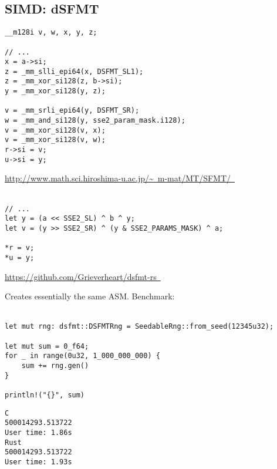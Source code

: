 \documentclass[14pt]{beamer}
\newcommand{\exturl}[1]{\exthref{#1}{#1}}
\newcommand{\exthref}[2]{\href{#1}{#2\ \footnotesize\faExternalLink}}
\begin{document}
\subsection{SIMD: dSFMT}
\begin{frame}[fragile]
  \fontsize{8pt}{8pt}\selectfont
  \begin{verbatim}
__m128i v, w, x, y, z;

// ...
x = a->si;
z = _mm_slli_epi64(x, DSFMT_SL1);
z = _mm_xor_si128(z, b->si);
y = _mm_xor_si128(y, z);

v = _mm_srli_epi64(y, DSFMT_SR);
w = _mm_and_si128(y, sse2_param_mask.i128);
v = _mm_xor_si128(v, x);
v = _mm_xor_si128(v, w);
r->si = v;
u->si = y;
  \end{verbatim}

  \begin{flushright}
    \exthref{http://www.math.sci.hiroshima-u.ac.jp/~\%20m-mat/MT/SFMT/}{http://www.math.sci.hiroshima-u.ac.jp/\textasciitilde\ m-mat/MT/SFMT/}\\~\\
  \end{flushright}

\pause
  \begin{verbatim}
// ...
let y = (a << SSE2_SL) ^ b ^ y;
let v = (y >> SSE2_SR) ^ (y & SSE2_PARAMS_MASK) ^ a;

*r = v;
*u = y;
  \end{verbatim}

  \begin{flushright}
    \exturl{https://github.com/Grieverheart/dsfmt-rs}
  \end{flushright}

\end{frame}

\begin{frame}[fragile]
  Creates essentially the same ASM. Benchmark:\\~\\

\fontsize{10pt}{10pt}\selectfont
  \begin{verbatim}
let mut rng: dsfmt::DSFMTRng = SeedableRng::from_seed(12345u32);

let mut sum = 0_f64;
for _ in range(0u32, 1_000_000_000) {
    sum += rng.gen()
}

println!("{}", sum)
  \end{verbatim}

\begin{verbatim}
C
500014293.513722
User time: 1.86s
Rust
500014293.513722
User time: 1.93s
\end{verbatim}
\end{frame}
\end{document}
